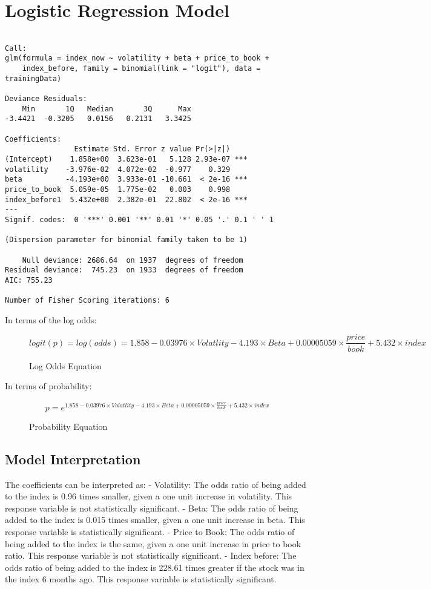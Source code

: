 \documentclass[12pt,twoside]{reedthesis}
\theoremstyle{definition}
\theoremstyle{definition}
\theoremstyle{definition}
\theoremstyle{remark}
\begin{document}
\section{Logistic Regression Model}\label{logistic-regression-model-1}
\begin{verbatim}

Call:
glm(formula = index_now ~ volatility + beta + price_to_book + 
    index_before, family = binomial(link = "logit"), data = trainingData)

Deviance Residuals: 
    Min       1Q   Median       3Q      Max  
-3.4421  -0.3205   0.0156   0.2131   3.3425  

Coefficients:
                Estimate Std. Error z value Pr(>|z|)    
(Intercept)    1.858e+00  3.623e-01   5.128 2.93e-07 ***
volatility    -3.976e-02  4.072e-02  -0.977    0.329    
beta          -4.193e+00  3.933e-01 -10.661  < 2e-16 ***
price_to_book  5.059e-05  1.775e-02   0.003    0.998    
index_before1  5.432e+00  2.382e-01  22.802  < 2e-16 ***
---
Signif. codes:  0 '***' 0.001 '**' 0.01 '*' 0.05 '.' 0.1 ' ' 1

(Dispersion parameter for binomial family taken to be 1)

    Null deviance: 2686.64  on 1937  degrees of freedom
Residual deviance:  745.23  on 1933  degrees of freedom
AIC: 755.23

Number of Fisher Scoring iterations: 6
\end{verbatim}
In terms of the log odds:
\begin{figure}
$$ logit(p) = log(odds) = 1.858 - 0.03976 \times Volatlity - 4.193 \times Beta + 0.00005059 \times \frac{price}{book} + 5.432 \times index $$
\caption{Log Odds Equation}
\end{figure}
\hfill\break
In terms of probability:
\begin{figure}
$$ p = e ^ {1.858 - 0.03976 \times Volatlity - 4.193 \times Beta + 0.00005059 \times \frac{price}{book} + 5.432 \times index} $$
\caption{Probability Equation}
\end{figure}
\subsection{Model Interpretation}\label{model-interpretation}

The coefficients can be interpreted as: \hfill\break
- Volatility: The odds ratio of being added to the index is 0.96 times
smaller, given a one unit increase in volatility. This response variable
is not statistically significant. \hfill\break
- Beta: The odds ratio of being added to the index is 0.015 times
smaller, given a one unit increase in beta. This response variable is
statistically significant. \hfill\break
- Price to Book: The odds ratio of being added to the index is the same,
given a one unit increase in price to book ratio. This response variable
is not statistically significant. \hfill\break
- Index before: The odds ratio of being added to the index is 228.61
times greater if the stock was in the index 6 months ago. This response
variable is statistically significant. \hfill\break
\end{document}
